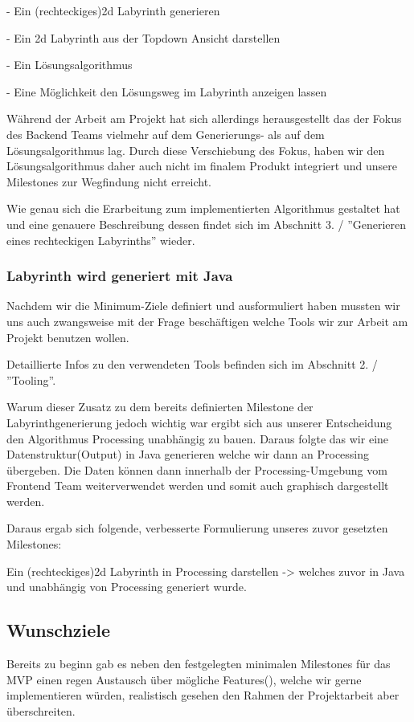 	- Ein (rechteckiges)2d Labyrinth generieren
	
	- Ein 2d Labyrinth aus der Topdown Ansicht darstellen 
		
	- Ein Lösungsalgorithmus
	
	- Eine Möglichkeit den Lösungsweg im Labyrinth anzeigen lassen
		
	Während der Arbeit am Projekt hat sich allerdings herausgestellt das der Fokus des Backend Teams vielmehr auf dem Generierungs- als auf dem Lösungsalgorithmus lag. Durch diese Verschiebung des Fokus, haben wir den Lösungsalgorithmus daher auch nicht im finalem Produkt integriert und unsere Milestones zur Wegfindung nicht erreicht.
	
	Wie genau sich die Erarbeitung zum implementierten Algorithmus gestaltet hat und eine genauere Beschreibung dessen findet sich im Abschnitt 3. / ''Generieren eines rechteckigen Labyrinths'' wieder.

    \subsubsection*{Labyrinth wird generiert mit Java}
		Nachdem wir die Minimum-Ziele definiert und ausformuliert haben mussten wir uns auch zwangsweise mit der Frage beschäftigen welche Tools wir zur Arbeit am Projekt benutzen wollen.
		
		Detaillierte Infos zu den verwendeten Tools befinden sich im Abschnitt 2. / ''Tooling''.
		
		Warum dieser Zusatz zu dem bereits definierten Milestone der Labyrinthgenerierung jedoch wichtig war ergibt sich aus unserer Entscheidung den Algorithmus Processing unabhängig zu bauen. Daraus folgte das wir eine Datenstruktur(Output) in Java generieren welche wir dann an Processing übergeben. Die Daten können dann innerhalb der Processing-Umgebung vom Frontend Team weiterverwendet werden und somit auch graphisch dargestellt werden.
		  
		Daraus ergab sich folgende, verbesserte Formulierung unseres zuvor gesetzten Milestones:    
		
		Ein (rechteckiges)2d Labyrinth in Processing darstellen -> welches zuvor in Java und unabhängig von Processing generiert wurde.

\subsection{Wunschziele}\label{subsec:Wunschziele}
    Bereits zu beginn gab es neben den festgelegten minimalen Milestones für das MVP einen regen Austausch über mögliche Features(), welche wir gerne implementieren würden, realistisch gesehen den Rahmen der Projektarbeit aber überschreiten.
    
